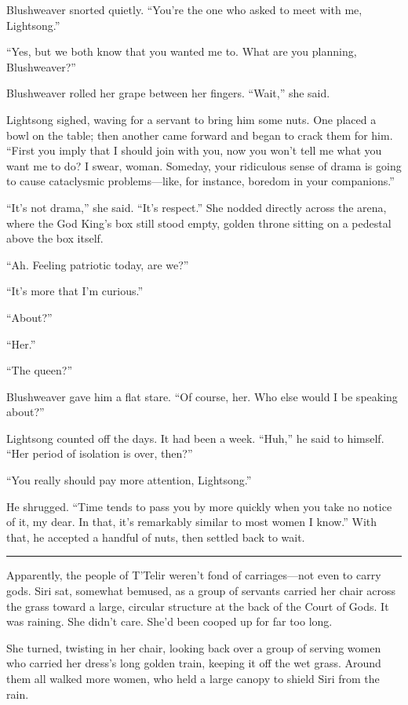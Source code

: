 Blushweaver snorted quietly. “You’re the one who asked to meet with me, Lightsong.”

“Yes, but we both know that you wanted me to. What are you planning, Blushweaver?”

Blushweaver rolled her grape between her fingers. “Wait,” she said.

Lightsong sighed, waving for a servant to bring him some nuts. One placed a bowl on the table; then another came forward and began to crack them for him. “First you imply that I should join with you, now you won’t tell me what you want me to do? I swear, woman. Someday, your ridiculous sense of drama is going to cause cataclysmic problems—like, for instance, boredom in your companions.”

“It’s not drama,” she said. “It’s respect.” She nodded directly across the arena, where the God King’s box still stood empty, golden throne sitting on a pedestal above the box itself.

“Ah. Feeling patriotic today, are we?”

“It’s more that I’m curious.”

“About?”

“Her.”

“The queen?”

Blushweaver gave him a flat stare. “Of course, her. Who else would I be speaking about?”

Lightsong counted off the days. It had been a week. “Huh,” he said to himself. “Her period of isolation is over, then?”

“You really should pay more attention, Lightsong.”

He shrugged. “Time tends to pass you by more quickly when you take no notice of it, my dear. In that, it’s remarkably similar to most women I know.” With that, he accepted a handful of nuts, then settled back to wait.

\bigskip \hrule \bigskip

Apparently, the people of T’Telir weren’t fond of carriages—not even to carry gods. Siri sat, somewhat bemused, as a group of servants carried her chair across the grass toward a large, circular structure at the back of the Court of Gods. It was raining. She didn’t care. She’d been cooped up for far too long.

She turned, twisting in her chair, looking back over a group of serving women who carried her dress’s long golden train, keeping it off the wet grass. Around them all walked more women, who held a large canopy to shield Siri from the rain.

